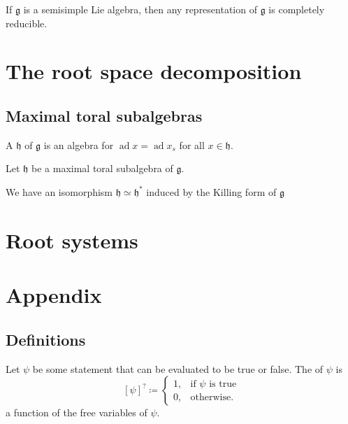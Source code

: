 \documentclass{article}
\DeclareMathOperator{\ad}{ad}
\newcommand*\frkg{{\ensuremath{\mathfrak{g}}}}
\newcommand*\frkh{{\ensuremath{\mathfrak{h}}}}
\begin{document}
\begin{theorem}
    If $\frkg$ is a semisimple Lie algebra, then any representation of $\frkg$ is completely reducible.
\end{theorem}

\section{The root space decomposition}

\subsection{Maximal toral subalgebras}

\begin{definition}
    A  $\frkh$ of $\frkg$ is an algebra for $\ad x = \ad x_s$ for all $x \in \frkh$.
\end{definition}

\begin{proposition}
    Let $\frkh$ be a maximal toral subalgebra of $\frkg$.

    We have an isomorphism $\frkh \simeq \frkh^\ast$ induced by the Killing form of $\frkg$
\end{proposition}

\section{Root systems}

\begin{definition}
\end{definition}

\section{Appendix}

\subsection{Definitions}

\begin{definition}
    \label{def:Iverson}
    Let $\psi$ be some statement that can be evaluated to be true or false.
    The  of $\psi$ is
    \[
        [\psi]^? \coloneq \begin{cases}
            1, & \text{if }\psi\text{ is true} \\
            0, & \text{otherwise}.
        \end{cases}
    \]
    a function of the free variables of $\psi$.
\end{definition}
\end{document}
